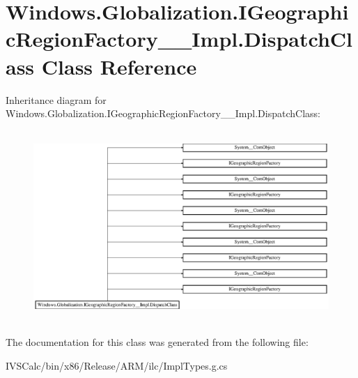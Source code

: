 \hypertarget{class_windows_1_1_globalization_1_1_i_geographic_region_factory_____impl_1_1_dispatch_class}{}\section{Windows.\+Globalization.\+I\+Geographic\+Region\+Factory\+\_\+\+\_\+\+Impl.\+Dispatch\+Class Class Reference}
\label{class_windows_1_1_globalization_1_1_i_geographic_region_factory_____impl_1_1_dispatch_class}
Inheritance diagram for Windows.\+Globalization.\+I\+Geographic\+Region\+Factory\+\_\+\+\_\+\+Impl.\+Dispatch\+Class\+:\begin{figure}[H]
\begin{center}
\leavevmode
\includegraphics[height=7.298578cm]{class_windows_1_1_globalization_1_1_i_geographic_region_factory_____impl_1_1_dispatch_class}
\end{center}
\end{figure}


The documentation for this class was generated from the following file\+:\begin{DoxyCompactItemize}
\item 
I\+V\+S\+Calc/bin/x86/\+Release/\+A\+R\+M/ilc/Impl\+Types.\+g.\+cs\end{DoxyCompactItemize}
